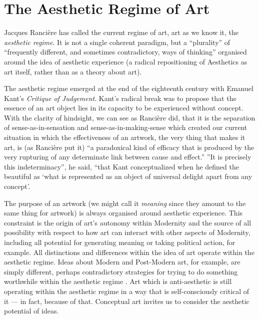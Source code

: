 \documentclass[letterpaper]{article}
\begin{document}
\section{The Aesthetic Regime of Art}

    Jacques Rancière has called the current regime of art, art as we know it, the \emph{aesthetic regime}.  It is not a single coherent paradigm, but a “plurality” of “frequently different, and sometimes contradictory, ways of thinking” \citep[p.8]{RanciereMdrnTms2022} organised around the idea of aesthetic experience (a radical repositioning of Aesthetics as art itself, rather than as a theory about art).
    
    The aesthetic regime emerged at the end of the eighteenth century with Emanuel Kant's \emph{Critique of Judgement}. Kant's radical break was to propose that the essence of an art object lies in its capacity to be experienced without concept. With the clarity of hindsight, we can see as Rancière did, that it is the separation of sense-as-in-sensation and sense-as-in-making-sense which created our current situation in which the effectiveness of an artwork, the very thing that makes it art, is (as Rancière put it) “a paradoxical kind of efficacy that is produced by the very rupturing of any determinate link between cause and effect.” \citep[p.51]{RancierThEmncptdSpcttr2009} ”It is precisely this indeterminacy”, he said, “that Kant conceptualized when he defined the beautiful as ‘what is represented as an object of universal delight apart from any concept’. \citep[p.52]{RancierThEmncptdSpcttr2009}

    The purpose of an artwork (we might call it \emph{meaning} since they amount to the same thing for artwork) is always organised around aesthetic experience. This constraint is the origin of art's autonomy within Modernity and the source of all possibility with respect to how art can interact with other aspects of Modernity, including all potential for generating meaning or taking political action, for example. All distinctions and differences within the idea of art operate within the aesthetic regime. Ideas about Modern and Post-Modern art, for example, are simply different, perhaps contradictory strategies for trying to do something worthwhile within the aesthetic regime \citep[p213]{ZepkeSblmArt2017}. Art which is anti-aesthetic is still operating within the aesthetic regime in a way that is self-consciously critical of it — in fact, because of that. Conceptual art invites us to consider the aesthetic potential of ideas.
\end{document}
